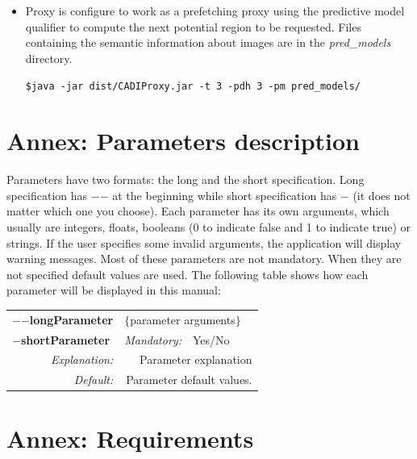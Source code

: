 \documentclass[a4paper,10pt]{article}
\begin{document}
\begin{itemize}
	\item Proxy is configure to work as a prefetching proxy using the predictive model qualifier to compute the next potential region to be requested. Files containing the semantic information about images are in the \emph{pred\_models} directory.
	\begin{framed}
	\texttt{\$java -jar dist/CADIProxy.jar -t 3 -pdh 3 -pm pred\_models/}
	\end{framed}
	
	
\end{itemize}


\newpage

\section*{Annex: Parameters description}
\label{sect:annex_parameters}
Parameters have two formats: the long and the short
specification. Long specification has $-$$-$ at the beginning while
short specification has $-$ (it does not matter which one you
choose). Each parameter has its own arguments, which usually are
integers, floats, booleans (0 to indicate false and 1 to indicate
true) or strings. If the user specifies some invalid arguments, the
application will display warning messages. Most of these parameters
are not mandatory. When they are not specified default values are
used. The following table shows how each parameter will be
displayed in this manual: 

\begin{center}\begin{tabular}{|rr|rlrl|}
	 \hline
	 \multicolumn{2}{|l|}{\textbf{$-$$-$longParameter}} &
	 \multicolumn{4}{|l|}{$\{$parameter arguments$\}$} \\
	 \cline{3-6}
	 \multicolumn{2}{|l|}{\textbf{$-$shortParameter}} & \emph{Mandatory:} & Yes/No & &  \\
	 \hline
	 \emph{Explanation:} & \multicolumn{5}{|p{12cm}|}{Parameter explanation} \\
	 \hline
	 \emph{Default:} & \multicolumn{5}{|p{12cm}|}{Parameter default values.} \\
	 \hline
\end{tabular}\end{center}

\newpage

\section*{Annex: Requirements}
\label{sect:annex}
\end{document}
